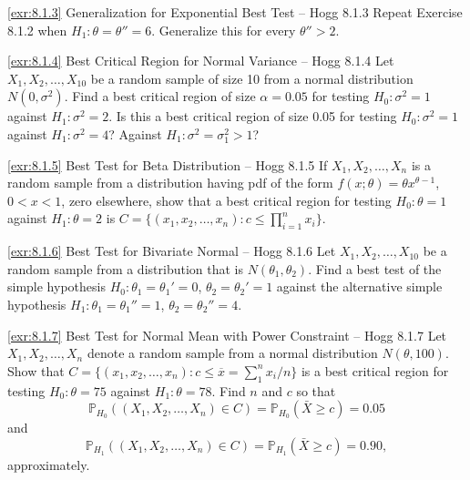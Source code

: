 \begin{exercise}{\ref{exr:8.1.3} Generalization for Exponential Best Test -- Hogg 8.1.3}\label{exr:8.1.3}
Repeat Exercise 8.1.2 when $H_1: \theta = \theta'' = 6$. Generalize this for every $\theta'' > 2$.
\end{exercise}

\begin{exercise}{\ref{exr:8.1.4} Best Critical Region for Normal Variance -- Hogg 8.1.4}\label{exr:8.1.4}
Let $X_1, X_2, \ldots, X_{10}$ be a random sample of size 10 from a normal distribution $N(0, \sigma^2)$. Find a best critical region of size $\alpha = 0.05$ for testing $H_0: \sigma^2 = 1$ against $H_1: \sigma^2 = 2$. Is this a best critical region of size 0.05 for testing $H_0: \sigma^2 = 1$ against $H_1: \sigma^2 = 4$? Against $H_1: \sigma^2 = \sigma_1^2 > 1$?
\end{exercise}

\begin{exercise}{\ref{exr:8.1.5} Best Test for Beta Distribution -- Hogg 8.1.5}\label{exr:8.1.5}
If $X_1, X_2, \ldots, X_n$ is a random sample from a distribution having pdf of the form $f(x; \theta) = \theta x^{\theta-1}$, $0 < x < 1$, zero elsewhere, show that a best critical region for testing $H_0: \theta = 1$ against $H_1: \theta = 2$ is $C = \{(x_1, x_2, \ldots, x_n): c \leq \prod_{i=1}^n x_i\}$.
\end{exercise}

\begin{exercise}{\ref{exr:8.1.6} Best Test for Bivariate Normal -- Hogg 8.1.6}\label{exr:8.1.6}
Let $X_1, X_2, \ldots, X_{10}$ be a random sample from a distribution that is $N(\theta_1, \theta_2)$. Find a best test of the simple hypothesis $H_0: \theta_1 = \theta_1' = 0$, $\theta_2 = \theta_2' = 1$ against the alternative simple hypothesis $H_1: \theta_1 = \theta_1'' = 1$, $\theta_2 = \theta_2'' = 4$.
\end{exercise}

\begin{exercise}{\ref{exr:8.1.7} Best Test for Normal Mean with Power Constraint -- Hogg 8.1.7}\label{exr:8.1.7}
Let $X_1, X_2, \ldots, X_n$ denote a random sample from a normal distribution $N(\theta, 100)$. Show that $C = \{(x_1, x_2, \ldots, x_n): c \leq \overline{x} = \sum_{1}^n x_i / n\}$ is a best critical region for testing $H_0: \theta = 75$ against $H_1: \theta = 78$. Find $n$ and $c$ so that
\[
\mathbb{P}_{H_0}((X_1, X_2, \ldots, X_n) \in C) = \mathbb{P}_{H_0}(\bar{X} \geq c) = 0.05
\]
and
\[
\mathbb{P}_{H_1}((X_1, X_2, \ldots, X_n) \in C) = \mathbb{P}_{H_1}(\bar{X} \geq c) = 0.90,
\]
approximately.
\end{exercise}

